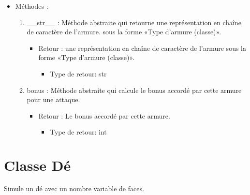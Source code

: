 \documentclass[12pt,pdftex,oneside]{article}
\begin{document}
\begin{itemize}
\begin{enumerate}
  \end{enumerate}

  \item Méthodes : 

    \begin{enumerate}
    \item \_\_str\_\_ : Méthode abstraite qui retourne une représentation en chaîne de caractère de l'armure.
      sous la forme «Type d'armure (classe)».
      \begin{itemize}
      \item Retour :  une représentation en chaîne de caractère de l'armure
      sous la forme «Type d'armure (classe)».
          \begin{itemize}
          \item Type de retour: str
          \end{itemize}
      \end{itemize}
    \item bonus : Méthode abstraite qui calcule le bonus accordé par cette armure
      pour une attaque.
      \begin{itemize}
      \item Retour : Le bonus accordé par cette armure.
          \begin{itemize}
          \item Type de retour: int
          \end{itemize}
      \end{itemize}

    \end{enumerate}
  \end{itemize}

  \section {Classe Dé}

  Simule un dé avec un nombre variable de faces.
\end{document}
